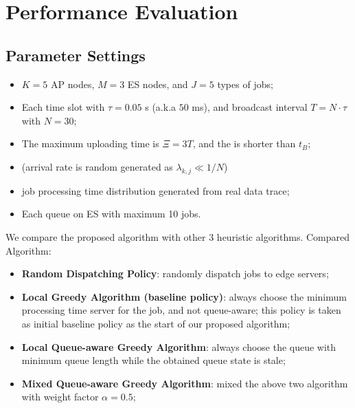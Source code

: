 \section{Performance Evaluation}

\subsection{Parameter Settings}
\begin{itemize}
    \item $K=5$ AP nodes, $M=3$ ES nodes, and $J=5$ types of jobs;
    \item Each time slot with $\tau=0.05$ s (a.k.a $50$ ms), and broadcast interval $T=N \cdot \tau$ with $N=30$;
    \item The maximum uploading time is $\Xi = 3 T$, and the \brlatency is shorter than $t_B$;
    \item (arrival rate is random generated as $\lambda_{k,j} \ll 1/N$)
    \item job processing time distribution generated from real data trace;
    \item Each queue on ES with maximum 10 jobs.
\end{itemize}

We compare the proposed algorithm with other 3 heuristic algorithms.
Compared Algorithm:
\begin{itemize}
    \item \textbf{Random Dispatching Policy}:
            randomly dispatch jobs to edge servers;
    \item \textbf{Local Greedy Algorithm (baseline policy)}:
            always choose the minimum processing time server for the job, and not queue-aware; this policy is taken as initial baseline policy as the start of our proposed algorithm;
    \item \textbf{Local Queue-aware Greedy Algorithm}:
            always choose the queue with minimum queue length while the obtained queue state is stale;
    \item \textbf{Mixed Queue-aware Greedy Algorithm}:
            mixed the above two algorithm with weight factor $\alpha = 0.5$;
\end{itemize}


